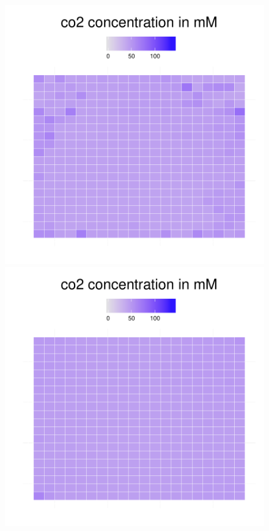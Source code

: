 \begin{figure}[h!]
{\begin{minipage}[t]{0.3\textwidth}
  \end{minipage}
  \begin{minipage}[t]{0.3\textwidth}
    \includegraphics[width=\textwidth]{../results/img/ecoli_20x20_aerob_seed55_co240.pdf}
  \end{minipage}
  \begin{minipage}[t]{0.3\textwidth}
    \includegraphics[width=\textwidth]{../results/img/ecoli_20x20_aerob_seed55_co250.pdf}

\end{minipage}}
\end{figure}
